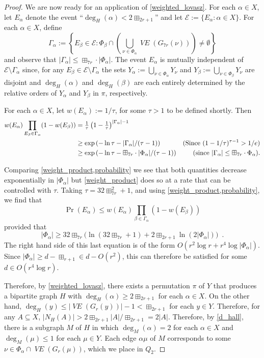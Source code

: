 \documentclass{patmorin}
\newcommand{\vol}[1]{\boxplus_{#1}}
\DeclareMathOperator{\VE}{\mathit{VE}}
\begin{document}
\begin{proof}
  We are now ready for an application of \cref{weighted_lovasz}.  For each $\alpha\in X$, let $E_\alpha$ denote the event ``$\deg_H(\alpha)< 2\vol{2r+1}$'' and let $\mathcal{E}:=\{E_\alpha:\alpha\in X\}$. For each $\alpha\in X$, define
  \[
     \Gamma_\alpha := \left\{E_\beta \in \mathcal{E}: \Phi_\beta\cap \left(\bigcup_{\nu\in \Phi_\alpha} \VE(G_{7r}(\nu))\right)\neq\emptyset\right\}
  \]
  and observe that $|\Gamma_\alpha|\le \vol{7r}\cdot|\Phi_\alpha|$.
  The event $E_\alpha$ is mutually independent of $\mathcal{E}\setminus\Gamma_\alpha$ since, for any $E_\beta\in\mathcal{E}\setminus\Gamma_\alpha$ the sets $Y_\alpha:=\bigcup_{\nu\in\Phi_\alpha} Y_\nu$ and $Y_\beta:=\bigcup_{\nu\in \Phi_\beta} Y_\nu$ are disjoint and $\deg_H(\alpha)$ and $\deg_H(\beta)$ are each entirely determined by the relative orders of $Y_\alpha$ and $Y_\beta$ in $\pi$, respectively.

  For each $\alpha\in X$, let $w(E_\alpha):=1/\tau$, for some $\tau>1$ to be defined shortly.  Then
  \begin{align}
    w(E_\alpha)\prod_{E_\beta\in\Gamma_\alpha} (1-w(E_\beta))
    & = \tfrac{1}{\tau}\left(1-\tfrac{1}{\tau}\right)^{|\Gamma_\alpha|-1} \notag \\
    & \ge \exp\left(-\ln\tau - |\Gamma_\alpha|/(\tau-1)\right) & \text{(Since $(1-1/\tau)^{\tau-1} > 1/e$)} \notag \\
    & \ge \exp\left(-\ln\tau - \vol{7r}\cdot|\Phi_\alpha|/(\tau-1)\right)
    & \text{(since $|\Gamma_\alpha|\le \vol{7r}\cdot\Phi_\alpha$).}  \label{weight_product}
  \end{align}

  Comparing \cref{weight_product,probability} we see that both quantities decrease exponentially in $|\Phi_\alpha|$ but \cref{weight_product} does so at a rate that can be controlled with $\tau$.
  Taking $\tau = {32\vol{7r}^2}+1$, and using \cref{weight_product,probability}, we find that
  \[
     \Pr\left(E_\alpha\right) \le w(E_\alpha)\prod_{\beta\in\Gamma_\alpha}(1-w(E_\beta))
  \]
  provided that
  \[   |\Phi_\alpha| \ge {32\vol{7r}}\big(\ln({32\vol{7r}}+1) + {2\vol{2r+1}}\ln(2|\Phi_\alpha|)\big) \enspace .
  \]
  The right hand side of this last equation is of the form $O(r^2\log r+r^4\log|\Phi_\alpha|)$.  Since $|\Phi_\alpha|\ge d-\vol{r+1}\in d- O(r^2)$, this can therefore be satisfied for some $d\in O(r^4\log r)$.

  Therefore, by \cref{weighted_lovasz}, there exists a permutation $\pi$ of $Y$ that produces a bipartite graph $H$ with $\deg_H(\alpha)\ge {2\vol{2r+1}}$ for each $\alpha\in X$.  On the other hand, $\deg_{H}(y)\le |\VE(G_r(y))|-1 < {\vol{2r+1}}$ for each $y\in Y$.  Therefore, for any $A\subseteq X$, $|N_H(A)|> {2\vol{2r+1}}|A|/{\vol{2r+1}} = 2|A|$.  Therefore, by \cref{d_hall}, there is a subgraph $M$ of $H$ in which $\deg_M(\alpha)=2$ for each $\alpha\in X$ and $\deg_M(\mu)\le 1$ for each $\mu\in Y$. Each edge $\alpha\mu$ of $M$ corresponds to some $\nu\in\Phi_\alpha\cap\VE(G_r(\mu))$, which we place in $Q_2$.


\end{proof}
\end{document}
